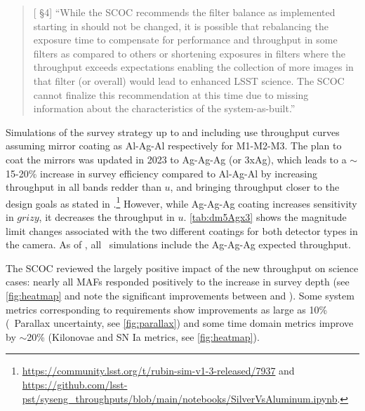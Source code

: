  \begin{quote}
    {[ \S4] ``While the SCOC recommends the filter balance as implemented starting in  should not be changed, it is possible that rebalancing the exposure time to compensate for performance and throughput in some filters as compared to others or shortening exposures in filters where the throughput exceeds expectations enabling the collection of more images in that filter (or overall) would lead to enhanced LSST science. The SCOC cannot finalize this recommendation at this time due to missing information about the characteristics of the system-as-built.''}
\end{quote}

Simulations of the survey strategy up to and including  use throughput curves assuming mirror coating as Al-Ag-Al respectively for M1-M2-M3. The plan to coat the mirrors was updated in 2023 to Ag-Ag-Ag (or 3xAg), which leads to a \mbox{$\sim$15-20\%} increase in survey efficiency compared to Al-Ag-Al by increasing throughput in all bands redder than $u$, and bringing throughput closer to the design goals as stated in .\footnote{\url{https://community.lsst.org/t/rubin-sim-v1-3-released/7937} and \url{https://github.com/lsst-pst/syseng_throughputs/blob/main/notebooks/SilverVsAluminum.ipynb}.}  However, while Ag-Ag-Ag coating increases sensitivity in $grizy$, it decreases the throughput in $u$.  \autoref{tab:dm5Agx3} shows the magnitude limit changes associated with the two different coatings for both detector types in the camera.  As of , all \opsim\ simulations include the Ag-Ag-Ag expected throughput.

The SCOC reviewed the largely positive impact of the new throughput on science cases: nearly all MAFs responded positively to the increase in survey depth (see \autoref{fig:heatmap} and note the significant improvements between  and ). Some system metrics corresponding to  requirements show improvements as large as 10\% (\eg\ Parallax uncertainty, see \autoref{fig:parallax}) and some time domain metrics improve by \mbox{$\sim$20\%} (Kilonovae and SN Ia metrics, see \autoref{fig:heatmap}). 
\clearpage

